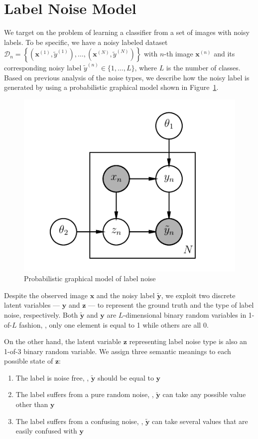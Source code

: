 \documentclass[10pt,twocolumn,letterpaper]{article}
\def\vec{\mathbf}
\begin{document}
\section{Label Noise Model} %
\label{sec:label_noise_model}
We target on the problem of learning a classifier from a set of images with noisy labels. To be specific, we have a noisy labeled dataset $\mathcal{D}_n=\left\{\left(\vec{x}^{(1)}, \tilde{y}^{(1)}\right), \dots, \left(\vec{x}^{(N)}, \tilde{y}^{(N)}\right)\right\}$ with $n$-th image $\vec{x}^{(n)}$ and its corresponding noisy label $\tilde{y}^{(n)} \in \{1,\dots,L\}$, where $L$ is the number of classes. Based on previous analysis of the noise types, we describe how the noisy label is generated by using a probabilistic graphical model shown in Figure~\ref{fig:noise_pgm}.

\begin{figure}[h!]
\begin{center}
\includegraphics[width=0.5\linewidth]{figure/pgm.pdf}
\end{center}
\caption{Probabilistic graphical model of label noise}
\label{fig:noise_pgm}
\end{figure}

Despite the observed image $\vec{x}$ and the noisy label $\tilde{\vec{y}}$, we exploit two discrete latent variables --- $\vec{y}$ and $\vec{z}$ --- to represent the ground truth and the type of label noise, respectively. Both $\tilde{\vec{y}}$ and $\vec{y}$ are $L$-dimensional binary random variables in 1-of-$L$ fashion, \ie, only one element is equal to 1 while others are all 0.

On the other hand, the latent variable $\vec{z}$ representing label noise type is also an 1-of-3 binary random variable. We assign three semantic meanings to each possible state of $\vec{z}$:
\begin{enumerate}
    \item The label is noise free, \ie, $\tilde{\vec{y}}$ should be equal to $\vec{y}$
    \item The label suffers from a pure random noise, \ie, $\tilde{\vec{y}}$ can take any possible value other than $\vec{y}$
    \item The label suffers from a confusing noise, \ie, $\tilde{\vec{y}}$ can take several values that are easily confused with $\vec{y}$
\end{enumerate}
\end{document}
